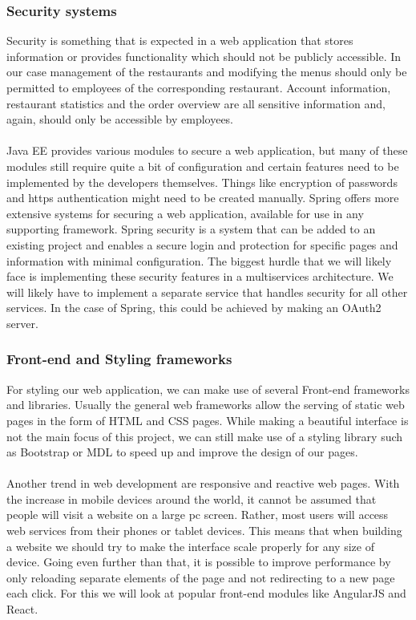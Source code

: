 \documentclass[12pt]{article}
\begin{document}
\begin{multicols}{2}
\subsubsection{Security systems}
Security is something that is expected in a web application that stores information or provides functionality which should not be publicly accessible. In our case management of the restaurants and modifying the menus should only be permitted to employees of the corresponding restaurant. Account information, restaurant statistics and the order overview are all sensitive information and, again, should only be accessible by employees.
\\\\
Java EE provides various modules to secure a web application, but many of these modules still require quite a bit of configuration and certain features need to be implemented by the developers themselves. Things like encryption of passwords and https authentication might need to be created manually. Spring offers more extensive systems for securing a web application, available for use in any supporting framework. Spring security is a system that can be added to an existing project and enables a secure login and protection for specific pages and information with minimal configuration. The biggest hurdle that we will likely face is implementing these security features in a multiservices architecture. We will likely have to implement a separate service that handles security for all other services. In the case of Spring, this could be achieved by making an OAuth2 server.

\subsubsection{Front-end and Styling frameworks}
For styling our web application, we can make use of several Front-end frameworks and libraries. Usually the general web frameworks allow the serving of static web pages in the form of HTML and CSS pages. While making a beautiful interface is not the main focus of this project, we can still make use of a styling library such as Bootstrap or MDL to speed up and improve the design of our pages.
\\\\
Another trend in web development are responsive and reactive web pages. With the increase in mobile devices around the world, it cannot be assumed that people will visit a website on a large pc screen. Rather, most users will access web services from their phones or tablet devices. This means that when building a website we should try to make the interface scale properly for any size of device. Going even further than that, it is possible to improve performance by only reloading separate elements of the page and not redirecting to a new page each click. For this we will look at popular front-end modules like AngularJS and React. 


\end{multicols}
\end{document}
